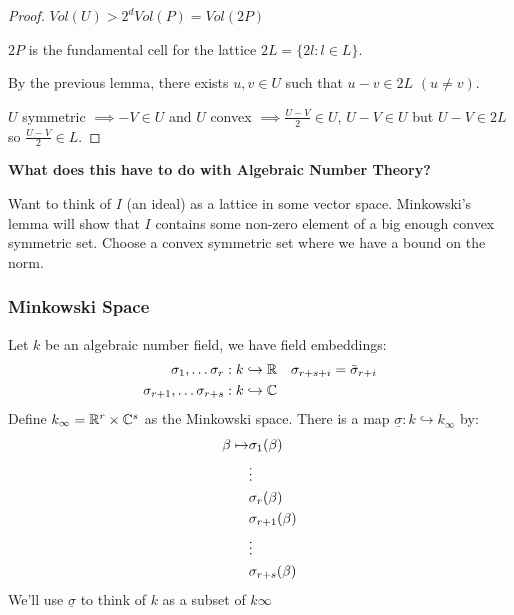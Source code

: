 \documentclass[11pt]{article}
\begin{document}
\begin{proof}
	$Vol(U) > 2^d Vol(P) = Vol(2P)$

	$2P$ is the fundamental cell for the lattice $2L = \{ 2l :l \in L\}$.
	\spa

	By the previous lemma, there exists $u,v \in U$ such that $u-v \in 2L $ $(u \neq v)$.
	\spa

	$U $ symmetric $\implies -V \in U$ and $U$ convex $\implies \frac{U-V}2 \in U$, $U - V \in U$ but $U-V \in 2L$ so $\frac{U-V}2 \in L$.
\end{proof}
\spac
\textbf{What does this have to do with Algebraic Number Theory?} 

Want to think of $I$ (an ideal) as a lattice in some vector space. 
Minkowski's lemma will show that $I$ contains some non-zero element of a big enough convex symmetric set. 
Choose a convex symmetric set where we have a bound on the norm.

\subsubsection{Minkowski Space}

Let $k$ be an algebraic number field, we have field embeddings:
\begin{align*}
	\sigma_1 , \dots \sigma_r : k \hookrightarrow \mathbb{R} && \sigma_{r+s+i} = \bar\sigma_{r+i}\\
	\sigma_{r+1}, \dots \sigma_{r+s} : k \hookrightarrow \mathbb{C} 
\end{align*}
\spa
Define $k_\infty = \mathbb{R}^r \times \mathbb{C}^s$ as the Minkowski space.
There is a map $\underline{\sigma}: k \hookrightarrow k_\infty$ by:
\begin{align*}
	\beta \mapsto &\sigma_1(\beta)\\
	&\vdots\\
	&\sigma_r(\beta)\\
	&\sigma_{r+1}(\beta)\\
	&\vdots\\
	&\sigma_{r+s}(\beta)
\end{align*}
We'll use $\underline\sigma $ to think of $k$ as a subset of $k \infty$
\end{document}
